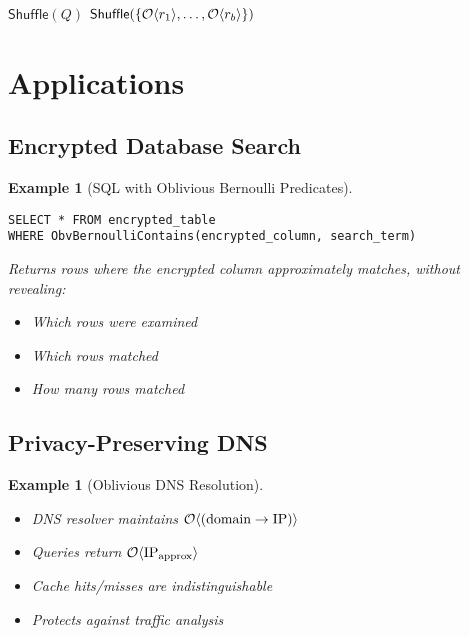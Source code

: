\documentclass[11pt,final]{article}
\newtheorem{example}[theorem]{Example}
\begin{document}
\begin{algorithm}[H]
\caption{Batched Oblivious Queries}
$\mathsf{Shuffle}(Q)$ 
$\mathsf{Shuffle}(\{\mathcal{O}\langle r_1 \rangle, \ldots, \mathcal{O}\langle r_b \rangle\})$\;
\end{algorithm}

\section{Applications}

\subsection{Encrypted Database Search}

\begin{example}[SQL with Oblivious Bernoulli Predicates]
\begin{verbatim}
SELECT * FROM encrypted_table 
WHERE ObvBernoulliContains(encrypted_column, search_term)
\end{verbatim}
Returns rows where the encrypted column approximately matches, without revealing:
\begin{itemize}
    \item Which rows were examined
    \item Which rows matched
    \item How many rows matched
\end{itemize}
\end{example}

\subsection{Privacy-Preserving DNS}

\begin{example}[Oblivious DNS Resolution]
\begin{itemize}
    \item DNS resolver maintains $\mathcal{O}\langle (\text{domain} \to \text{IP}) \rangle$
    \item Queries return $\mathcal{O}\langle \text{IP}_{\text{approx}} \rangle$
    \item Cache hits/misses are indistinguishable
    \item Protects against traffic analysis
\end{itemize}
\end{example}
\end{document}
